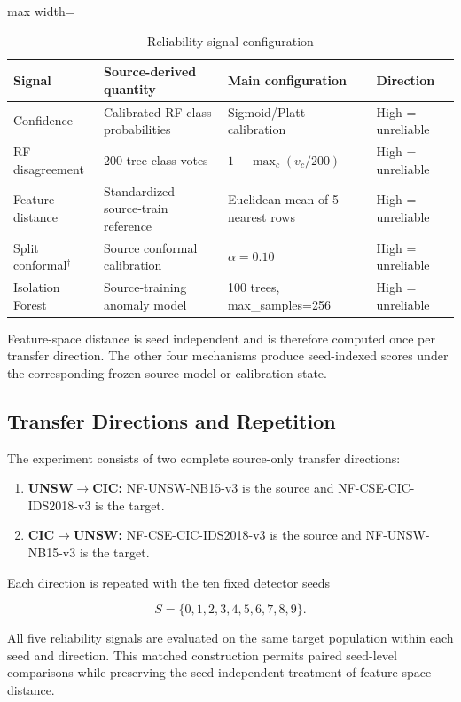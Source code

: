 \documentclass[conference]{IEEEtran}
\begin{document}
\begin{table}[t]
\centering
\caption{Reliability signal configuration}
\begin{adjustbox}{max width=\columnwidth}
\begin{tabular}{llll}
\toprule
\textbf{Signal} & \textbf{Source-derived quantity} & \textbf{Main configuration} & \textbf{Direction} \\
\midrule
Confidence & Calibrated RF class probabilities & Sigmoid/Platt calibration & High = unreliable \\
RF disagreement & 200 tree class votes & $1-\max_c(v_c/200)$ & High = unreliable \\
Feature distance & Standardized source-train reference & Euclidean mean of 5 nearest rows & High = unreliable \\
Split conformal$^\dagger$ & Source conformal calibration & $\alpha=0.10$ & High = unreliable \\
Isolation Forest & Source-training anomaly model & 100 trees, max\_samples=256 & High = unreliable \\
\bottomrule
\end{tabular}
\end{adjustbox}
\end{table}

Feature-space distance is seed independent and is therefore computed once per transfer direction. The other four mechanisms produce seed-indexed scores under the corresponding frozen source model or calibration state.

\subsection{Transfer Directions and Repetition}

The experiment consists of two complete source-only transfer directions:

\begin{enumerate}
\item \textbf{UNSW$\rightarrow$CIC:} NF-UNSW-NB15-v3 is the source and NF-CSE-CIC-IDS2018-v3 is the target.
\item \textbf{CIC$\rightarrow$UNSW:} NF-CSE-CIC-IDS2018-v3 is the source and NF-UNSW-NB15-v3 is the target.
\end{enumerate}

Each direction is repeated with the ten fixed detector seeds

\[
S=\{0,1,2,3,4,5,6,7,8,9\}.
\]

All five reliability signals are evaluated on the same target population within each seed and direction. This matched construction permits paired seed-level comparisons while preserving the seed-independent treatment of feature-space distance.
\end{document}
